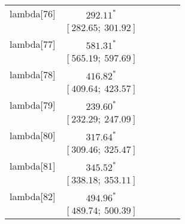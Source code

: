 \begin{table}
\begin{center}
\begin{tabular}{l c c c c c }
lambda[76]  & $292.11^{*}$                     &                           &                           &                         &                         \\
            & $[282.65;\ 301.92]$              &                           &                           &                         &                         \\
lambda[77]  & $581.31^{*}$                     &                           &                           &                         &                         \\
            & $[565.19;\ 597.69]$              &                           &                           &                         &                         \\
lambda[78]  & $416.82^{*}$                     &                           &                           &                         &                         \\
            & $[409.64;\ 423.57]$              &                           &                           &                         &                         \\
lambda[79]  & $239.60^{*}$                     &                           &                           &                         &                         \\
            & $[232.29;\ 247.09]$              &                           &                           &                         &                         \\
lambda[80]  & $317.64^{*}$                     &                           &                           &                         &                         \\
            & $[309.46;\ 325.47]$              &                           &                           &                         &                         \\
lambda[81]  & $345.52^{*}$                     &                           &                           &                         &                         \\
            & $[338.18;\ 353.11]$              &                           &                           &                         &                         \\
lambda[82]  & $494.96^{*}$                     &                           &                           &                         &                         \\
            & $[489.74;\ 500.39]$              &                           &                           &                         &                         \\

\end{tabular}
\end{center}
\end{table}
